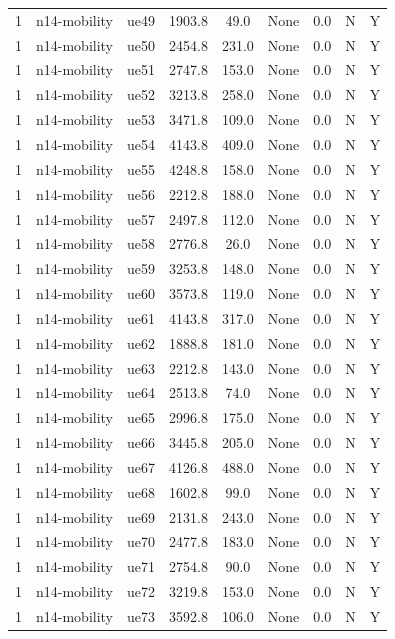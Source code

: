 \begin{table}[ht]
\begin{tabular}{|c|c|c|c|c|c|c|c|c|}
1 & n14-mobility & ue49 & 1903.8 & 49.0 & None & 0.0 & N & Y \\
1 & n14-mobility & ue50 & 2454.8 & 231.0 & None & 0.0 & N & Y \\
1 & n14-mobility & ue51 & 2747.8 & 153.0 & None & 0.0 & N & Y \\
1 & n14-mobility & ue52 & 3213.8 & 258.0 & None & 0.0 & N & Y \\
1 & n14-mobility & ue53 & 3471.8 & 109.0 & None & 0.0 & N & Y \\
1 & n14-mobility & ue54 & 4143.8 & 409.0 & None & 0.0 & N & Y \\
1 & n14-mobility & ue55 & 4248.8 & 158.0 & None & 0.0 & N & Y \\
1 & n14-mobility & ue56 & 2212.8 & 188.0 & None & 0.0 & N & Y \\
1 & n14-mobility & ue57 & 2497.8 & 112.0 & None & 0.0 & N & Y \\
1 & n14-mobility & ue58 & 2776.8 & 26.0 & None & 0.0 & N & Y \\
1 & n14-mobility & ue59 & 3253.8 & 148.0 & None & 0.0 & N & Y \\
1 & n14-mobility & ue60 & 3573.8 & 119.0 & None & 0.0 & N & Y \\
1 & n14-mobility & ue61 & 4143.8 & 317.0 & None & 0.0 & N & Y \\
1 & n14-mobility & ue62 & 1888.8 & 181.0 & None & 0.0 & N & Y \\
1 & n14-mobility & ue63 & 2212.8 & 143.0 & None & 0.0 & N & Y \\
1 & n14-mobility & ue64 & 2513.8 & 74.0 & None & 0.0 & N & Y \\
1 & n14-mobility & ue65 & 2996.8 & 175.0 & None & 0.0 & N & Y \\
1 & n14-mobility & ue66 & 3445.8 & 205.0 & None & 0.0 & N & Y \\
1 & n14-mobility & ue67 & 4126.8 & 488.0 & None & 0.0 & N & Y \\
1 & n14-mobility & ue68 & 1602.8 & 99.0 & None & 0.0 & N & Y \\
1 & n14-mobility & ue69 & 2131.8 & 243.0 & None & 0.0 & N & Y \\
1 & n14-mobility & ue70 & 2477.8 & 183.0 & None & 0.0 & N & Y \\
1 & n14-mobility & ue71 & 2754.8 & 90.0 & None & 0.0 & N & Y \\
1 & n14-mobility & ue72 & 3219.8 & 153.0 & None & 0.0 & N & Y \\
1 & n14-mobility & ue73 & 3592.8 & 106.0 & None & 0.0 & N & Y \\

\end{tabular}
\end{table}
